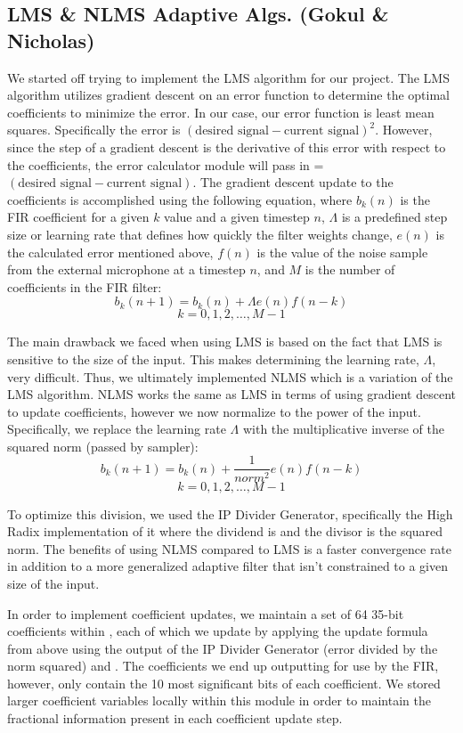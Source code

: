 \documentclass{fpgairpods}
\begin{document}
\subsection{LMS \& NLMS Adaptive Algs. (Gokul \& Nicholas)}
We started off trying to implement the LMS algorithm for our project. The LMS algorithm utilizes gradient descent on an error function to determine the optimal coefficients to minimize the error. In our case, our error function is least mean squares. Specifically the error is $(\text{desired signal} - \text{current signal})^2$. However, since the step of a gradient descent is the derivative of this error with respect to the coefficients, the error calculator module will pass in  = $(\text{desired signal} - \text{current signal})$. The gradient descent update to the coefficients is accomplished using the following equation\cite{lmsfilter}, where $b_k(n)$ is the FIR coefficient for a given $k$ value and a given timestep $n$, $\Lambda$ is a predefined step size or learning rate that defines how quickly the filter weights change, $e(n)$ is the calculated error mentioned above, $f(n)$ is the value of the noise sample from the external microphone at a timestep $n$, and $M$ is the number of coefficients in the FIR filter:
\[ b_k(n + 1) = b_k(n) + \Lambda e(n)f(n-k) \]
\[ k = 0, 1, 2,\ldots,  M-1 \]

The main drawback we faced when using LMS is based on the fact that LMS is sensitive to the size of the input. This makes determining the learning rate, $\Lambda$, very difficult. Thus, we ultimately implemented NLMS which is a variation of the LMS algorithm. NLMS works the same as LMS in terms of using gradient descent to update coefficients, however we now normalize to the power of the input. Specifically, we replace the learning rate $\Lambda$ with the multiplicative inverse of the squared norm (passed by sampler):
\[ b_k(n + 1) = b_k(n) + \frac{1}{norm^2} e(n)f(n-k) \]
\[ k = 0, 1, 2,\ldots,  M-1 \]

To optimize this division, we used the IP Divider Generator, specifically the High Radix implementation of it where the dividend is  and the divisor is the squared norm. The benefits of using NLMS compared to LMS is a faster convergence rate in addition to a more generalized adaptive filter that isn't constrained to a given size of the input. 

In order to implement coefficient updates, we maintain a set of 64 35-bit coefficients within , each of which we update by applying the update formula from above using the output of the IP Divider Generator  (error divided by the norm squared) and . The coefficients we end up outputting for use by the FIR, however, only contain the 10 most significant bits of each  coefficient. We stored larger coefficient variables locally within this module in order to maintain the fractional information present in each coefficient update step.
\end{document}
